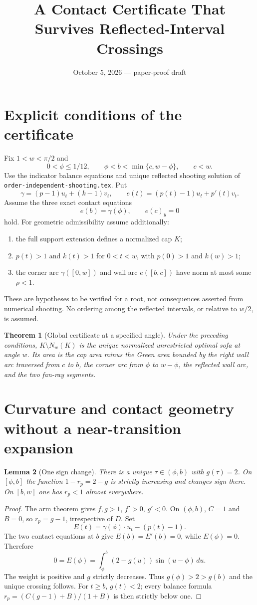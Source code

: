 \documentclass[11pt]{article}
\title{A Contact Certificate That Survives Reflected-Interval Crossings}
\author{}\date{October 5, 2026 --- paper-proof draft}
\newtheorem{theorem}{Theorem}[section]
\newtheorem{lemma}[theorem]{Lemma}
\begin{document}
\maketitle

\section{Explicit conditions of the certificate}
Fix $1<w<\pi/2$ and
\[
 0<\phi\le1/12,\qquad \phi<b<\min\{c,w-\phi\},\qquad c<w.
\]
Use the indicator balance equations and unique reflected shooting solution of \texttt{order-independent-shooting.tex}. Put
\[
 \gamma=(p-1)u_t+(k-1)v_t,\qquad e(t)=(p(t)-1)u_t+p'(t)v_t.
\]
Assume the three exact contact equations
\[
 e(b)=\gamma(\phi),\qquad e(c)_y=0
\]
hold. For geometric admissibility assume additionally:
\begin{enumerate}
\item the full support extension defines a normalized cap $K$;
\item $p(t)>1$ and $k(t)>1$ for $0<t<w$, with $p(0)>1$ and $k(w)>1$;
\item the corner arc $\gamma([0,w])$ and wall arc $e([b,c])$ have norm at most some $\rho<1$.
\end{enumerate}
These are hypotheses to be verified for a root, not consequences asserted from numerical shooting. No ordering among the reflected intervals, or relative to $w/2$, is assumed.

\begin{theorem}[Global certificate at a specified angle]\label{thm:main}
Under the preceding conditions, $K\setminus N_w(K)$ is the unique normalized unrestricted optimal sofa at angle $w$. Its area is the cap area minus the Green area bounded by the right wall arc traversed from $c$ to $b$, the corner arc from $\phi$ to $w-\phi$, the reflected wall arc, and the two fan-ray segments.
\end{theorem}

\section{Curvature and contact geometry without a near-transition expansion}
\begin{lemma}[One sign change]
There is a unique $\tau\in(\phi,b)$ with $g(\tau)=2$. On $[\phi,b]$ the function $1-r_p=2-g$ is strictly increasing and changes sign there. On $[b,w]$ one has $r_p<1$ almost everywhere.
\end{lemma}
\begin{proof}
The arm theorem gives $f,g>1$, $f'>0$, $g'<0$. On $(\phi,b)$, $C=1$ and $B=0$, so $r_p=g-1$, irrespective of $D$. Set
\[
 E(t)=\gamma(\phi)\cdot u_t-(p(t)-1).
\]
The two contact equations at $b$ give $E(b)=E'(b)=0$, while $E(\phi)=0$. Therefore
\[
 0=E(\phi)=\int_\phi^b(2-g(u))\sin(u-\phi)\,du.
\]
The weight is positive and $g$ strictly decreases. Thus $g(\phi)>2>g(b)$ and the unique crossing follows. For $t\ge b$, $g(t)<2$; every balance formula $r_p=(C(g-1)+B)/(1+B)$ is then strictly below one.
\end{proof}
\end{document}
